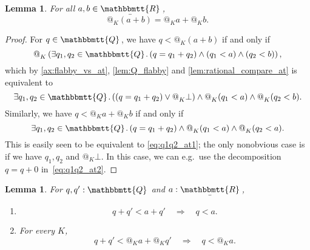 \documentclass[11pt, oneside, article]{memoir}
\makeatletter
\theoremstyle{plain}
\newtheorem{lemma}[theorem]{Lemma}
\theoremstyle{definition}
\theoremstyle{remark}
\newcommand{\ubar}[1]{\underaccent{\bar}{#1}}
\newcommand{\internal}[1]{\raisebox{-.03ex}{$\mathbbmtt{#1}$}}
\newcommand{\hs}{\hspace{1.1pt}}
\newcommand{\tQQ}{\internal{Q}\hs}
\newcommand{\tRR}{\internal{R}\hs}
\newcommand{\tLR}{\ubar{\tRR}\hs}
\newcommand{\BaseSpace}{B}
\newcommand{\CB}{C\BaseSpace}
\newcommand{\AtSymbol}{{@}}
\newcommand{\At}[2][]{\AtSymbol^{#1}_{#2}}
\newcommand{\imp}{\Rightarrow}
\makeatother
\begin{document}



\begin{lemma}
	For all $a,b\in\tLR$,
	\[
		\At{K}(a + b) = \At{K} a + \At{K} b.
	\]
	\label{lem.at_plus_commute}
\end{lemma}

\begin{proof}
	For $q\in\tQQ$, we have $q < \At{K}(a + b)$ if and only if
	\[
		\At{K}\left(\exists q_1, q_2\in\tQQ\ldotp (q = q_1 + q_2) \land (q_1 < a) \land (q_2 < b)\right),
	\]
	which by \cref{ax:flabby_vs_at}, \cref{lem:Q_flabby} and \cref{lem:rational_compare_at} is equivalent to
	\begin{equation}
		\label{eq:q1q2_at1}
		\exists q_1, q_2\in\tQQ\ldotp \left((q = q_1 + q_2) \lor \At{K} \bot\right) \land \At{K}(q_1 < a) \land \At{K}(q_2 < b).
	\end{equation}
	Similarly, we have $q < \At{K} a + \At{K} b$ if and only if
	\begin{equation}
		\label{eq:q1q2_at2}
		\exists q_1, q_2 \in \tQQ \ldotp (q = q_1 + q_2) \land \At{K}(q_1 < a) \land \At{K}(q_2 < a).
	\end{equation}
	This is easily seen to be equivalent to \eqref{eq:q1q2_at1}; the only nonobvious case is if we have $q_1, q_2$ and $\At{K} \bot$. In this case, we can e.g.~use the decomposition $q = q + 0$ in~\eqref{eq:q1q2_at2}.
\end{proof}

\begin{lemma}
	For $q,q':\tQQ$ and $a : \tLR$,
	\begin{enumerate}
	\item 
		\[
			q + q' < a + q' \quad \Longrightarrow \quad q < a.
		\]
	\item For every $K$,
		\[
			q + q' < \At{K} a + \At{K} q' \quad \Longrightarrow \quad q < \At{K} a.
		\]
	\label{lem:subtract_q}
	\end{enumerate}
\end{lemma}
\end{document}

